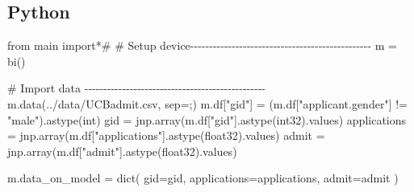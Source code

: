 \documentclass[
  letterpaper,
  DIV=11,
  numbers=noendperiod]{scrreprt}
\newenvironment{Shaded}{\begin{snugshade}}{\end{snugshade}}
\newcommand{\BuiltInTok}[1]{\textcolor[rgb]{0.00,0.23,0.31}{#1}}
\newcommand{\CommentTok}[1]{\textcolor[rgb]{0.37,0.37,0.37}{#1}}
\newcommand{\ImportTok}[1]{\textcolor[rgb]{0.00,0.46,0.62}{#1}}
\newcommand{\NormalTok}[1]{\textcolor[rgb]{0.00,0.23,0.31}{#1}}
\newcommand{\OperatorTok}[1]{\textcolor[rgb]{0.37,0.37,0.37}{#1}}
\newcommand{\StringTok}[1]{\textcolor[rgb]{0.13,0.47,0.30}{#1}}
\begin{document}
\subsection{Python}

\begin{Shaded}
\begin{Highlighting}[]
\ImportTok{from}\NormalTok{ main }\ImportTok{import}\OperatorTok{*}\CommentTok{\#}
\CommentTok{\# Setup device{-}{-}{-}{-}{-}{-}{-}{-}{-}{-}{-}{-}{-}{-}{-}{-}{-}{-}{-}{-}{-}{-}{-}{-}{-}{-}{-}{-}{-}{-}{-}{-}{-}{-}{-}{-}{-}{-}{-}{-}{-}{-}{-}{-}{-}{-}{-}{-}}
\NormalTok{m }\OperatorTok{=}\NormalTok{ bi()}

\CommentTok{\# Import data {-}{-}{-}{-}{-}{-}{-}{-}{-}{-}{-}{-}{-}{-}{-}{-}{-}{-}{-}{-}{-}{-}{-}{-}{-}{-}{-}{-}{-}{-}{-}{-}{-}{-}{-}{-}{-}{-}{-}{-}{-}{-}{-}{-}{-}{-}{-}{-}}
\NormalTok{m.data(}\StringTok{\textquotesingle{}../data/UCBadmit.csv\textquotesingle{}}\NormalTok{, sep}\OperatorTok{=}\StringTok{\textquotesingle{};\textquotesingle{}}\NormalTok{) }
\NormalTok{m.df[}\StringTok{"gid"}\NormalTok{] }\OperatorTok{=}\NormalTok{ (m.df[}\StringTok{"applicant.gender"}\NormalTok{] }\OperatorTok{!=} \StringTok{"male"}\NormalTok{).astype(}\BuiltInTok{int}\NormalTok{)}
\NormalTok{gid }\OperatorTok{=}\NormalTok{ jnp.array(m.df[}\StringTok{"gid"}\NormalTok{].astype(}\StringTok{\textquotesingle{}int32\textquotesingle{}}\NormalTok{).values)}
\NormalTok{applications }\OperatorTok{=}\NormalTok{ jnp.array(m.df[}\StringTok{"applications"}\NormalTok{].astype(}\StringTok{\textquotesingle{}float32\textquotesingle{}}\NormalTok{).values)}
\NormalTok{admit }\OperatorTok{=}\NormalTok{ jnp.array(m.df[}\StringTok{"admit"}\NormalTok{].astype(}\StringTok{\textquotesingle{}float32\textquotesingle{}}\NormalTok{).values)}

\NormalTok{m.data\_on\_model }\OperatorTok{=} \BuiltInTok{dict}\NormalTok{(}
\NormalTok{    gid}\OperatorTok{=}\NormalTok{gid,}
\NormalTok{    applications}\OperatorTok{=}\NormalTok{applications,}
\NormalTok{    admit}\OperatorTok{=}\NormalTok{admit}
\NormalTok{)}


\end{Highlighting}
\end{Shaded}
\end{document}
